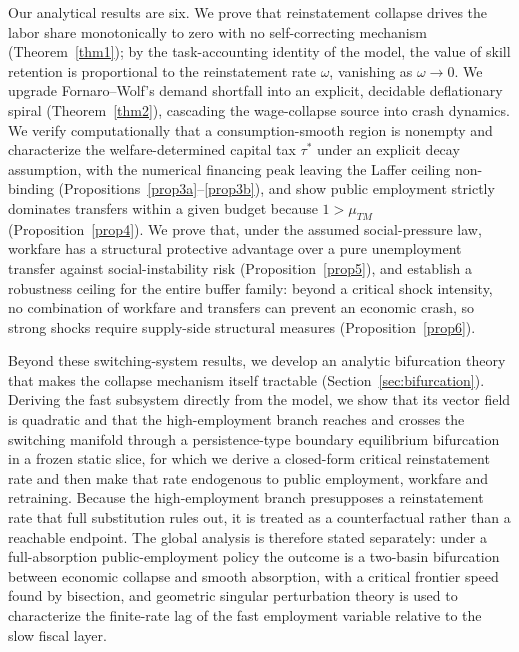\documentclass[review,12pt]{elsarticle}
\theoremstyle{plain}
\theoremstyle{definition}
\theoremstyle{remark}
\begin{document}
Our analytical results are six. We prove that reinstatement collapse drives the labor share monotonically to zero with no self-correcting mechanism (Theorem~\ref{thm1}); by the task-accounting identity of the model, the value of skill retention is proportional to the reinstatement rate $\omega$, vanishing as $\omega\to0$. We upgrade Fornaro--Wolf's demand shortfall into an explicit, decidable deflationary spiral (Theorem~\ref{thm2}), cascading the wage-collapse source into crash dynamics. We verify computationally that a consumption-smooth region is nonempty and characterize the welfare-determined capital tax $\tau^*$ under an explicit decay assumption, with the numerical financing peak leaving the Laffer ceiling non-binding (Propositions~\ref{prop3a}--\ref{prop3b}), and show public employment strictly dominates transfers within a given budget because $1>\mu_{TM}$ (Proposition~\ref{prop4}). We prove that, under the assumed social-pressure law, workfare has a structural protective advantage over a pure unemployment transfer against social-instability risk (Proposition~\ref{prop5}), and establish a robustness ceiling for the entire buffer family: beyond a critical shock intensity, no combination of workfare and transfers can prevent an economic crash, so strong shocks require supply-side structural measures (Proposition~\ref{prop6}).

Beyond these switching-system results, we develop an analytic bifurcation theory that makes the collapse mechanism itself tractable (Section~\ref{sec:bifurcation}). Deriving the fast subsystem directly from the model, we show that its vector field is quadratic and that the high-employment branch reaches and crosses the switching manifold through a persistence-type boundary equilibrium bifurcation in a frozen static slice, for which we derive a closed-form critical reinstatement rate and then make that rate endogenous to public employment, workfare and retraining. Because the high-employment branch presupposes a reinstatement rate that full substitution rules out, it is treated as a counterfactual rather than a reachable endpoint. The global analysis is therefore stated separately: under a full-absorption public-employment policy the outcome is a two-basin bifurcation between economic collapse and smooth absorption, with a critical frontier speed found by bisection, and geometric singular perturbation theory is used to characterize the finite-rate lag of the fast employment variable relative to the slow fiscal layer.
\end{document}
